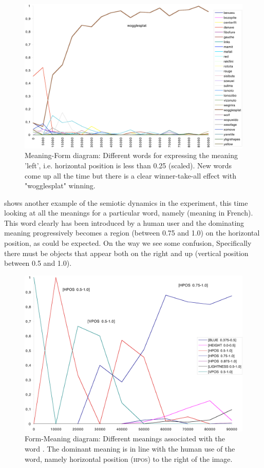\begin{figure}[htbp]
  \centerline{\includegraphics[width=\textwidth]{chap8/figures/wogglesplat.pdf}}
\caption{\label{fig:woggle}Meaning-Form diagram: Different words for expressing the meaning 'left', i.e. 
horizontal position is less than 0.25 (scaled). 
New words come up all the time but there is a clear winner-take-all effect with "wogglesplat" winning. 
}
\end{figure}

 shows another example of the semiotic dynamics in the experiment, this time looking at all the 
meanings for a particular word, namely  (meaning  in French). This word clearly has been introduced
by a human user and the dominating meaning progressively becomes a region (between 0.75 and 1.0) on the horizontal position, 
as could be expected. On the way we see some confusion, Specifically there must be objects that appear both on the right 
and up (vertical position between 0.5 and 1.0). 

\begin{figure}[htbp]
  \centerline{\includegraphics[width=\textwidth]{chap8/figures/droite.pdf}}
\caption{\label{fig:droite}Form-Meaning diagram: Different meanings associated with the word . The dominant meaning is 
in line with the human use of the word, namely horizontal position (\textsc{hpos}) to the right of the image.}
\end{figure}

